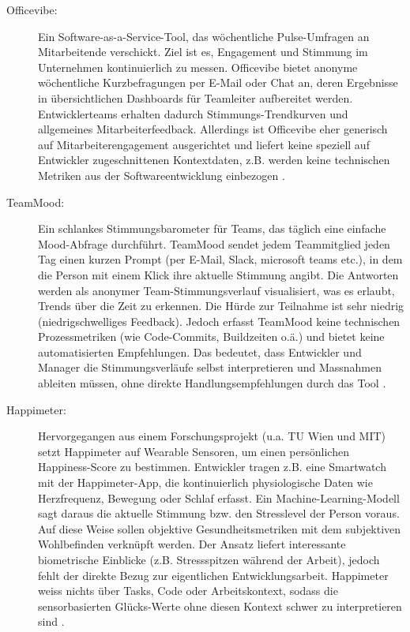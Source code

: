\documentclass[12pt,a4paper]{report}
\begin{document}
\begin{description}
  \item[Officevibe:] Ein Software-as-a-Service-Tool, das wöchentliche Pulse-Umfragen an Mitarbeitende verschickt. Ziel ist es,
    Engagement und Stimmung im Unternehmen kontinuierlich zu messen. Officevibe bietet anonyme wöchentliche Kurzbefragungen per
    E-Mail oder Chat an, deren Ergebnisse in übersichtlichen Dashboards für Teamleiter aufbereitet werden. Entwicklerteams erhalten
    dadurch Stimmungs-Trendkurven und allgemeines Mitarbeiterfeedback. Allerdings ist Officevibe eher generisch auf
    Mitarbeiterengagement ausgerichtet und liefert keine speziell auf Entwickler zugeschnittenen Kontextdaten, z.B. werden keine
    technischen Metriken aus der Softwareentwicklung einbezogen \cite{courier_officevibe_2025}.

  \item[TeamMood:] Ein schlankes Stimmungsbarometer für Teams, das täglich eine einfache Mood-Abfrage durchführt. TeamMood sendet
    jedem Teammitglied jeden Tag einen kurzen Prompt (per E-Mail, Slack, microsoft teams etc.), in dem die Person mit einem Klick
    ihre aktuelle Stimmung angibt. Die Antworten werden als anonymer Team-Stimmungsverlauf visualisiert, was es erlaubt, Trends über
    die Zeit zu erkennen. Die Hürde zur Teilnahme ist sehr niedrig (niedrigschwelliges Feedback). Jedoch erfasst TeamMood keine
    technischen Prozessmetriken (wie Code-Commits, Buildzeiten o.ä.) und bietet keine automatisierten Empfehlungen. Das bedeutet,
    dass Entwickler und Manager die Stimmungsverläufe selbst interpretieren und Massnahmen ableiten müssen, ohne direkte
    Handlungsempfehlungen durch das Tool \cite{revelo_teammood_2025}.

  \item[Happimeter:] Hervorgegangen aus einem Forschungsprojekt (u.a. TU Wien und MIT) setzt Happimeter auf Wearable Sensoren, um
    einen persönlichen Happiness-Score zu bestimmen. Entwickler tragen z.B. eine Smartwatch mit der Happimeter-App, die
    kontinuierlich physiologische Daten wie Herzfrequenz, Bewegung oder Schlaf erfasst. Ein Machine-Learning-Modell sagt daraus
    die aktuelle Stimmung bzw. den Stresslevel der Person voraus. Auf diese Weise sollen objektive Gesundheitsmetriken mit dem
    subjektiven Wohlbefinden verknüpft werden. Der Ansatz liefert interessante biometrische Einblicke (z.B. Stressspitzen während
    der Arbeit), jedoch fehlt der direkte Bezug zur eigentlichen Entwicklungsarbeit. Happimeter weiss nichts über Tasks, Code oder
    Arbeitskontext, sodass die sensorbasierten Glücks-Werte ohne diesen Kontext schwer zu interpretieren sind
    \cite{budner_making_2017}.


\end{description}
\end{document}
